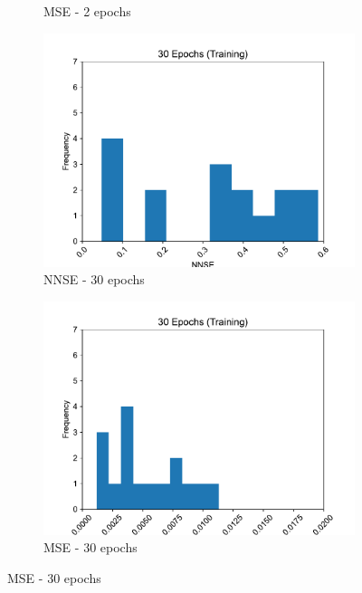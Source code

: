\documentclass[11pt,twocolumn]{article}
\begin{document}
\begin{figure}[p]
\begin{subfigure}[b]{0.49\textwidth}
        \caption{MSE - 2 epochs}
        \label{fig:tbd2}
     \end{subfigure}
     \hfill
     \newline
     \begin{subfigure}[b]{0.49\textwidth}
        \centering\includegraphics[width=1.0\linewidth]{images/30_training-NNSE.pdf}
        \caption{NNSE - 30 epochs}
        \label{fig:tbd3}
     \end{subfigure}
     \hfill
     \begin{subfigure}[b]{0.49\textwidth}
        \centering\includegraphics[width=1.0\linewidth]{images/30_training-MSE.pdf}
        \caption{MSE - 30 epochs}
        \label{fig:tbd4}
     \end{subfigure}

\end{figure}
\end{document}
